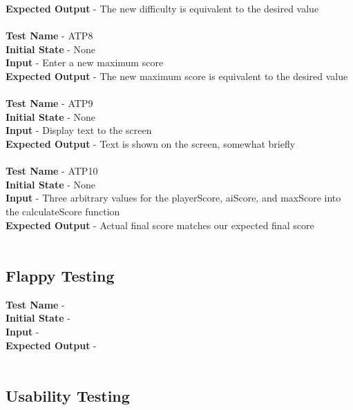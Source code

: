 \documentclass[12pt, titlepage]{article}
\begin{document}
\textbf{Expected Output} - The new difficulty is equivalent to the desired value\\ \\
\textbf{Test Name} - ATP8\\
\textbf{Initial State} - None\\
\textbf{Input} - Enter a new maximum score\\
\textbf{Expected Output} - The new maximum score is equivalent to the desired value\\ \\
\textbf{Test Name} - ATP9\\
\textbf{Initial State} - None\\
\textbf{Input} - Display text to the screen\\
\textbf{Expected Output} - Text is shown on the screen, somewhat briefly\\ \\
\textbf{Test Name} - ATP10\\
\textbf{Initial State} - None\\
\textbf{Input} - Three arbitrary values for the playerScore, aiScore, and maxScore into the calculateScore function\\
\textbf{Expected Output} - Actual final score matches our expected final score\\ \\


\subsection{Flappy Testing}

\textbf{Test Name} - \\
\textbf{Initial State} - \\
\textbf{Input} - \\
\textbf{Expected Output} - \\ \\ 

\subsection{Usability Testing}
\end{document}
